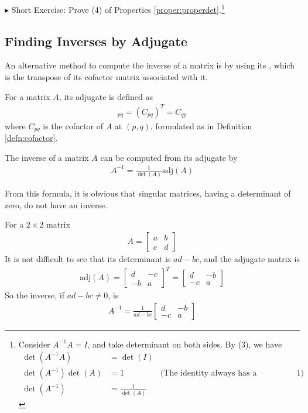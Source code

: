 $\blacktriangleright$ Short Exercise: Prove (4) of Properties \ref{proper:properdet}.\footnote{Consider $A^{-1}A=I$, and take determinant on both sides. By (3), we have
\begin{align*}
\det(A^{-1}A) &= \det(I) \\
\det(A^{-1})\det(A) &= 1 & \text{(The identity always has a determinant of $1$)} \\
\det(A^{-1}) &= \frac{1}{\det(A)}
\end{align*}}

\subsection{Finding Inverses by Adjugate}
An alternative method to compute the inverse of a matrix is by using its , which is the transpose of its cofactor matrix associated with it.
\begin{defn}[Adjugate]
For a matrix $A$, its adjugate is defined as
\begin{align}
[\text{adj}(A)]_{pq} = (C_{pq})^T = C_{qp}
\end{align}
where $C_{pq}$ is the cofactor of $A$ at $(p, q)$, formulated as in Definition \ref{defn:cofactor}.
\end{defn}
\begin{proper}
\label{proper:invadj}
The inverse of a matrix $A$ can be computed from its adjugate by
\begin{align}
A^{-1} = \frac{1}{\det(A)}\text{adj}(A)
\end{align}
\end{proper}
From this formula, it is obvious that singular matrices, having a determinant of zero, do not have an inverse.
\begin{exmp}
\label{exmp:2x2}
For a $2 \times 2$ matrix
\begin{align*}
A = \begin{bmatrix}
a & b \\
c & d
\end{bmatrix}    
\end{align*}
It is not difficult to see that its determinant is $ad - bc$, and the adjugate matrix is
\begin{align*}
\text{adj}(A) = 
\begin{bmatrix}
d & -c \\
-b & a 
\end{bmatrix}^T = 
\begin{bmatrix}
d & -b \\
-c & a 
\end{bmatrix}    
\end{align*}
So the inverse, if $ad - bc \neq 0$, is
\begin{align}
A^{-1} = 
\frac{1}{ad-bc}
\begin{bmatrix}
d & -b \\
-c & a 
\end{bmatrix}
\label{eqn:2times2inv}
\end{align}
\end{exmp}


